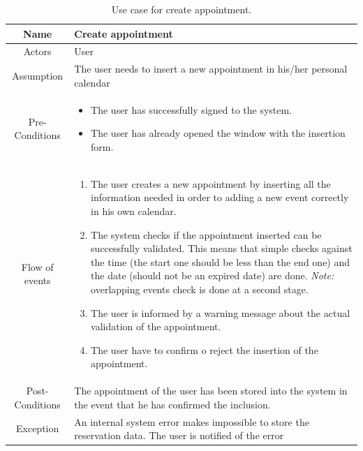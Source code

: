 \begin{table}
\centering
	\begin{tabular}{|c||p{}|}
		\hline
		Name & Create appointment \\ \hline
		Actors & User \\ \hline
		Assumption & The user needs to insert a new appointment in his/her personal calendar \\ \hline
		Pre-Conditions & \begin{itemize}
			\item The user has successfully signed to the system.
			\item The user has already opened the window with the insertion form.
		\end{itemize} \\ \hline
		Flow of events & \begin{enumerate}
			\item The user creates a new appointment by inserting all the information needed in order to adding a new event correctly in his own calendar.
			\item The system checks if the appointment inserted can be successfully validated. This means that simple checks against the time (the start one should be less than the end one) and the date (should not be an expired date) are done. \textit{Note:} overlapping events check is done at a second stage. 
			\item The user is informed by a warning message about the actual validation of the appointment.
			\item The user have to confirm o reject the insertion of the appointment.
		\end{enumerate} \\ \hline
		Post-Conditions & The appointment of the user has been stored into the system in the event that he has confirmed the inclusion. \\ \hline
		Exception & An internal system error makes impossible to store the reservation data. The user is notified of the error \\ \hline		
	\end{tabular}
\caption{Use case for create appointment.}
\label{usecase_app}
\end{table}
    

